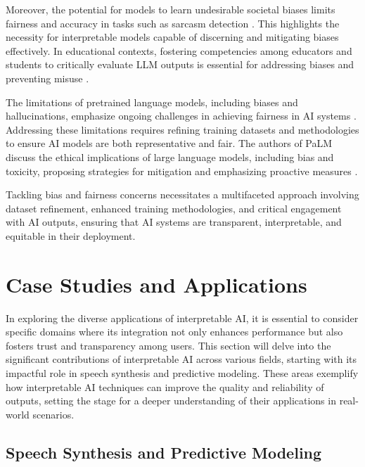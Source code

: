 Moreover, the potential for models to learn undesirable societal biases limits fairness and accuracy in tasks such as sarcasm detection \cite{nimase2024morecontextshelpsarcasm}. This highlights the necessity for interpretable models capable of discerning and mitigating biases effectively. In educational contexts, fostering competencies among educators and students to critically evaluate LLM outputs is essential for addressing biases and preventing misuse \cite{kasneci2023chatgpt}.

The limitations of pretrained language models, including biases and hallucinations, emphasize ongoing challenges in achieving fairness in AI systems \cite{alayrac2022flamingo}. Addressing these limitations requires refining training datasets and methodologies to ensure AI models are both representative and fair. The authors of PaLM discuss the ethical implications of large language models, including bias and toxicity, proposing strategies for mitigation and emphasizing proactive measures \cite{chowdhery2023palm}.

Tackling bias and fairness concerns necessitates a multifaceted approach involving dataset refinement, enhanced training methodologies, and critical engagement with AI outputs, ensuring that AI systems are transparent, interpretable, and equitable in their deployment.




\section{Case Studies and Applications} \label{sec:Case Studies and Applications}

In exploring the diverse applications of interpretable AI, it is essential to consider specific domains where its integration not only enhances performance but also fosters trust and transparency among users. This section will delve into the significant contributions of interpretable AI across various fields, starting with its impactful role in speech synthesis and predictive modeling. These areas exemplify how interpretable AI techniques can improve the quality and reliability of outputs, setting the stage for a deeper understanding of their applications in real-world scenarios.





\subsection{Speech Synthesis and Predictive Modeling} \label{subsec:Speech Synthesis and Predictive Modeling}



